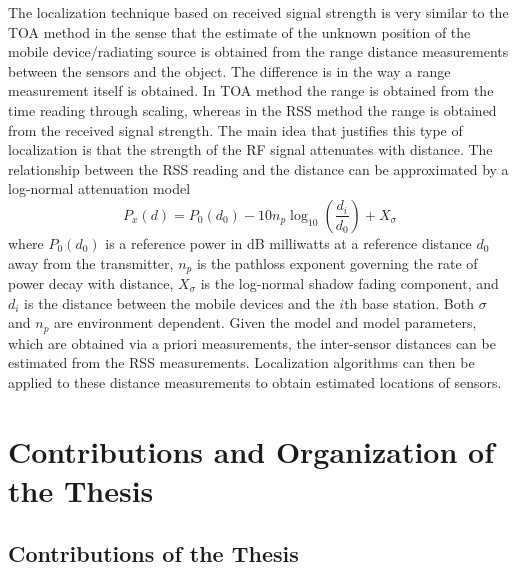 The localization technique based on received signal strength is very similar to the TOA method in the sense that the estimate of the unknown position of the mobile device/radiating source is obtained from the range distance measurements between the sensors and the object.
The difference is in the way a range measurement itself is obtained. In TOA method the range is obtained from the time reading through scaling, whereas in the RSS method the range is obtained from the received signal strength. 
The main idea that justifies this type of localization is that the strength of the RF signal attenuates with distance. The relationship between the RSS reading and the distance can be approximated by a log-normal attenuation model \cite{LiuSurvey}
\begin{equation}
\nonumber
P_x(d) = P_0(d_0) - 10n_p\log_{10}\left(\frac{d_i}{d_0}\right) + X_{\sigma}
\end{equation}
where $P_0(d_0)$ is a reference power in dB milliwatts at a reference distance $d_0$ away from the transmitter, $n_p$ is the pathloss exponent governing the rate of power decay with distance, $X_{\sigma}$ is the log-normal shadow fading component, and $d_i$ is the distance between the mobile devices and the $i$th base station. Both $\sigma$ and $n_p$ are environment dependent. Given the model and model parameters, which are obtained via a priori measurements, the inter-sensor distances can be estimated from the RSS measurements. Localization algorithms can then be applied to these distance measurements to obtain estimated locations of sensors.

\section{Contributions and Organization of the Thesis}

\subsection{Contributions  of the Thesis} \label{contributions}


